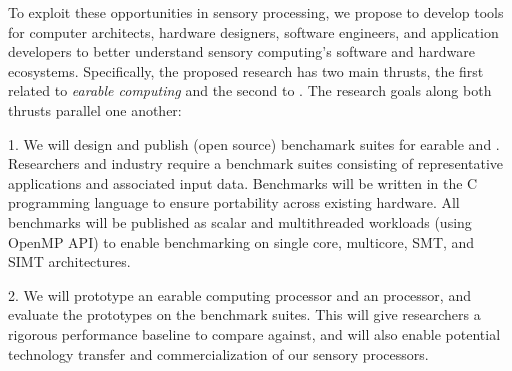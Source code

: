 To exploit these opportunities in sensory processing, we propose to develop
tools for computer architects, hardware designers, software engineers, and
application developers to better understand sensory computing's software and
hardware ecosystems.  Specifically, the proposed research has two main thrusts,
the first related to \textit{earable computing} and the second to \textit{\olfc}.
The research goals along both thrusts parallel one another:

1. We will design and publish (open source) benchamark suites for earable and
\olfc{}.  Researchers and industry require a benchmark suites
consisting of representative applications and associated input data.  Benchmarks
will be written in the C programming language to ensure portability across
existing hardware.  All benchmarks will be published as scalar
and multithreaded workloads (using OpenMP API) to enable benchmarking on single
core, multicore, SMT, and SIMT architectures.

2. We will prototype an earable computing processor and an \olfc{}
processor, and evaluate the prototypes on the benchmark suites.  This will
give researchers a rigorous performance baseline to compare against, and will
also enable potential technology transfer and commercialization of our sensory
processors.
